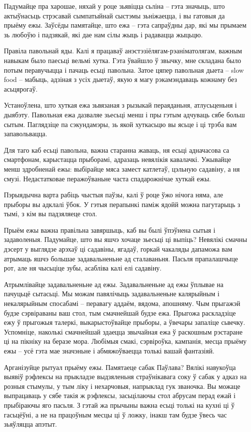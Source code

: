 Падумайце пра харошае, няхай у роце зьявіцца сьліна – гэта значыць, што актыўнасьць стрэсавай сымпатыйнай сыстэмы зьніжаецца, і вы гатовыя да прыёму ежы. Заўсёды памятайце, што ежа – гэта сапраўдны дар, які мы прымаем зь любоўю і падзякай, які дае нам сілы жыць і радавацца жыцьцю.

Правіла павольнай яды. Калі я працаваў анэстэзіёлягам-рэаніматолягам, важным навыкам было паесьці вельмі хутка. Гэта ўвайшло ў звычку, мне складана было потым перавучыцца і пачаць есьці павольна. Затое цяпер павольная дыета – slow food – мабыць, адзіная з усіх дыетаў, якую я магу рэкамэндаваць кожнаму без асьцярогаў.

Устаноўлена, што хуткая ежа зьвязаная з рызыкай пераяданьня, атлусьценьня і дыябэту. Павольная ежа дазваляе зьесьці менш і пры гэтым адчуваць сябе больш сытым. Паглядзіце па сэкундамэры, зь якой хуткасьцю вы ясьце і ці трэба вам запавольвацца.

Для таго каб есьці павольна, важна старанна жаваць, ня есьці адначасова са смартфонам, карыстацца прыборамі, адразаць невялікія кавалачкі. Ужывайце менш здробненай ежы: выбірайце мяса замест катлетаў, цэльную садавіну, а ня смузі. Недастатковае перажоўваньне часта спадарожнічае хуткай ежы.

Пэрыядычна варта рабіць чыстыя паўзы, калі ў роце ўжо нічога няма, але прыборы вы адклалі ўбок. У гэтыя перапынкі паміж ядойй можна пагутарыць з тымі, з кім вы падзяляеце стол.

Прыём ежы важна правільна завяршыць, каб вы былі ўпэўнена сытыя і задаволеныя. Падумайце, што вы яшчэ хочаце зьесьці ці выпіць? Невялікі смачны дэсерт у выглядзе арэхаў ці садавіны, ягадаў, горкай чакаляды дапаможа вам атрымаць яшчэ большае задавальненьне ад сталаваньня. Пасьля прапалашчыце рот, але ня чысьціце зубы, асабліва калі елі садавіну.

Атрымлівайце задавальненьне ад ежы. Задавальненьне ад ежы ўплывае на пачуцьцё сытасьці. Мы можам павялічыць задавальненьне калярыйным і некалярыйным спосабамі – перавагу аддаём, вядома, апошняму. Чым прыгажэй будзе сэрвіраваны ваш стол, тым смачнейшай будзе ежа. Прыгожа раскладзіце ежу ў прыгожыя талеркі, выкарыстоўвайце прыборы, а ўвечары запаліце сьвечку. Успомніце, наколькі смачнейшай здаецца звычайная ежа ў раскошным рэстаране ці на пікніку на беразе мора. Любімыя смакі, сэрвіроўка, кампанія, месца прыёму ежы – усё гэта мае значэньне і абмяжоўваецца толькі вашай фантазіяй.

Арганізуйце рытуал прыёму ежы. Памятаеце сабак Паўлава? Вялікі навукоўца выявіў рэфлексы на прыкладзе выдзяленьня страўнікавага соку ў сабак у адказ на розныя стымулы, у тым ліку і нехарчовыя, напрыклад гук званочка. Вы можаце выпрацаваць у сябе такія ж рэфлексы, засьцілаючы стол абрусам перад ежай і прыбіраючы яго пасьля. З гэтай жа прычыны важна есьці толькі на кухні ці ў гасьцёўні, а не на працоўным месцы ці ў ложку, інакш там будзе ўвесь час зьяўляцца апэтыт.

